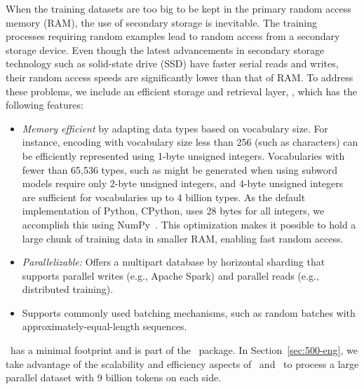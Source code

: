 When the training datasets are too big to be kept in the primary random access memory (RAM), the use of secondary storage is inevitable.
The training processes requiring random examples lead to random access from a secondary storage device.
Even though the latest advancements in secondary storage technology such as solid-state drive (SSD) have faster serial reads and writes, their random access speeds are significantly lower than that of RAM. 
To address these problems, we include an efficient storage and retrieval layer, \nldb, which has the following features:
\begin{itemize}[noitemsep,topsep=0pt,leftmargin=4mm]
  \item \textit{Memory efficient} by adapting data types based on vocabulary size. For instance, encoding with vocabulary size less than 256 (such as characters) can be efficiently represented using 1-byte unsigned integers. Vocabularies with fewer than 65,536 types, such as might be generated when using subword models \cite{sennrich-etal-2016-bpe} require only 2-byte unsigned integers, and 4-byte unsigned integers are sufficient for vocabularies up to 4 billion types. 
As the default implementation of Python, CPython, uses 28 bytes for all integers, we accomplish this using NumPy~\cite{harris2020numpy}. This optimization makes it possible to hold a large chunk of training data in smaller RAM, enabling fast random access.
  \item \textit{Parallelizable:} Offers a multipart database by horizontal sharding that supports parallel writes (e.g., Apache Spark) and parallel reads (e.g., distributed training).
  \item Supports commonly used batching mechanisms, such as random batches with approximately-equal-length sequences.
\end{itemize}

\nldb\ has a minimal footprint and is part of the \nlcodec\ package.
In Section~\ref{sec:500-eng}, we take advantage of the scalability and efficiency aspects of \nlcodec\ and \nldb\ to process a large parallel dataset with 9 billion tokens on each side.


